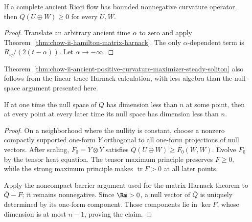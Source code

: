 \begin{corollary}
\label{cor:chow-ii-ancient-matrix-harnack}
If a complete ancient Ricci flow has bounded nonnegative curvature operator,
then \(\overline Q(U\oplus W)\ge0\) for every \(U,W\).
\end{corollary}
\begin{proof}
\sketch Translate an arbitrary ancient time \(\alpha\) to zero and apply
Theorem~\ref{thm:chow-ii-hamilton-matrix-harnack}.  The only
\(\alpha\)-dependent term is \(R_{ij}/(2(t-\alpha))\).  Let
\(\alpha\to-\infty\).
\end{proof}

\begin{remark}
\label{rem:chow-ii-alternative-ancient-rigidity-proof}
Theorem~\ref{thm:chow-ii-ancient-positive-curvature-maximizer-steady-soliton}
also follows from the linear trace Harnack calculation, with less algebra than
the null-space argument presented here.
\end{remark}

\begin{lemma}
\label{lem:chow-ii-ancient-harnack-nullspace-propagation}
If at one time the null space of \(\overline Q\) has dimension less than
\(n\) at some point, then at every point at every later time its null space
has dimension less than \(n\).
\end{lemma}
\begin{proof}
\sketch On a neighborhood where the nullity is constant, choose a nonzero compactly
supported one-form \(Y\) orthogonal to all one-form projections of null
vectors.  After scaling, \(F_0=Y\otimes Y\) satisfies
\(\overline Q(U\oplus W)\ge F_0(W,W)\).  Evolve \(F_0\) by the tensor heat
equation.  The tensor maximum principle preserves \(F\ge0\), while the strong
maximum principle makes \(\operatorname{tr}F>0\) at all later points.

Apply the noncompact barrier argument used for the matrix Harnack theorem to
\(\overline Q-F\); it remains nonnegative.  Since \(\Rm>0\), a null vector
of \(\overline Q\) is uniquely determined by its one-form component.  Those
components lie in \(\ker F\), whose dimension is at most \(n-1\), proving the
claim.
\end{proof}

